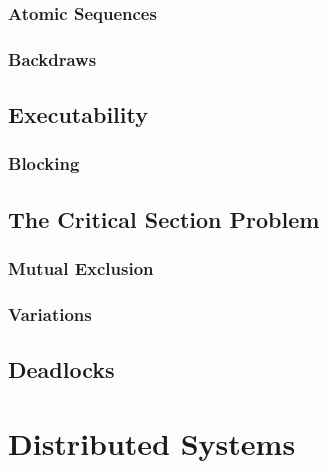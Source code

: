 \documentclass[a4paper, 11pt, accentcolor = tud3b]{tudreport}
\begin{document}
                \subsubsection{Atomic Sequences} %

                \subsubsection{Backdraws} %

            \subsection{Executability} %

                \subsubsection{Blocking} %

            \subsection{The Critical Section Problem} %

                \subsubsection{Mutual Exclusion} %

                \subsubsection{Variations} %

            \subsection{Deadlocks} %

        \section{Distributed Systems} %
\end{document}
